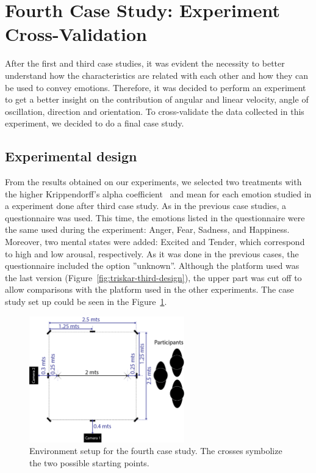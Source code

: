 \section{Fourth Case Study: Experiment Cross-Validation}

After the first and third case studies, it was evident the necessity to better understand how the characteristics are related with each other and how they can be used to convey emotions. Therefore, it was decided to perform an experiment~\cite{Angel2017} to get a better insight on the contribution of angular and linear velocity, angle of oscillation, direction and orientation. To cross-validate the data collected in this experiment, we decided to do a final case study.

\subsection{Experimental design}

From the results obtained on our experiments, we selected two treatments with the higher Krippendorff's alpha coefficient~\cite{Klaus2007} and mean for each emotion studied in a experiment done after third case study. As in the previous case studies, a questionnaire was used. This time, the emotions listed in the questionnaire were the same used during the experiment: Anger, Fear, Sadness, and Happiness. Moreover, two mental states were added: Excited and Tender, which correspond to high and low arousal, respectively. As it was done in the previous cases, the questionnaire included the option ''unknown''. Although the platform used was the last version (Figure~\ref{fig:triskar-third-design}), the upper part was cut off to allow comparisons with the platform used in the other experiments. The case study set up could be seen in the Figure~\ref{fig:setup_fourth}.

\begin{figure}[h]
	\centering
	\includegraphics[width=0.60\textwidth]{./Images/FourthCase.png} 
	\caption{Environment setup for the fourth case study. The crosses symbolize the two possible starting points.}
	\label{fig:setup_fourth}
\end{figure}
 
